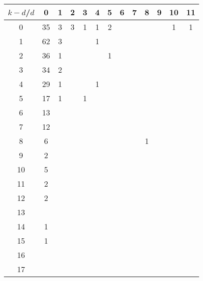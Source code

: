 \documentclass{article}
\begin{document}
\begin{table}[h]\footnotesize
{\centering
\begin{tabular}{|c|c|
c|c|c|c|c|c|c|c|c|c|c|}
  \hline
  $k-d$/$d$ 
 & 0 & 1 & 2 & 3 & 4 & 5 & 6 & 7 & 8 & 9 & 10 & 11\\

  \hline
  \hline

0  & 35 & 3 & 3 & 1 & 1 & 2 &  &  &  &  & 1 & 1\\

1  & 62 & 3 &  &  & 1 &  &  &  &  &  &  & \\

2  & 36 & 1 &  &  &  & 1 &  &  &  &  &  & \\

3  & 34 & 2 &  &  &  &  &  &  &  &  &  & \\

4  & 29 & 1 &  &  & 1 &  &  &  &  &  &  & \\

5  & 17 & 1 &  & 1 &  &  &  &  &  &  &  & \\

6  & 13 &  &  &  &  &  &  &  &  &  &  & \\

7  & 12 &  &  &  &  &  &  &  &  &  &  & \\

8  & 6 &  &  &  &  &  &  &  & 1 &  &  & \\

9  & 2 &  &  &  &  &  &  &  &  &  &  & \\

10  & 5 &  &  &  &  &  &  &  &  &  &  & \\

11  & 2 &  &  &  &  &  &  &  &  &  &  & \\

12  & 2 &  &  &  &  &  &  &  &  &  &  & \\

13  &  &  &  &  &  &  &  &  &  &  &  & \\

14  & 1 &  &  &  &  &  &  &  &  &  &  & \\

15  & 1 &  &  &  &  &  &  &  &  &  &  & \\

16  &  &  &  &  &  &  &  &  &  &  &  & \\

17  &  &  &  &  &  &  &  &  &  &  &  & \\


\end{tabular}}
\end{table}
\end{document}
